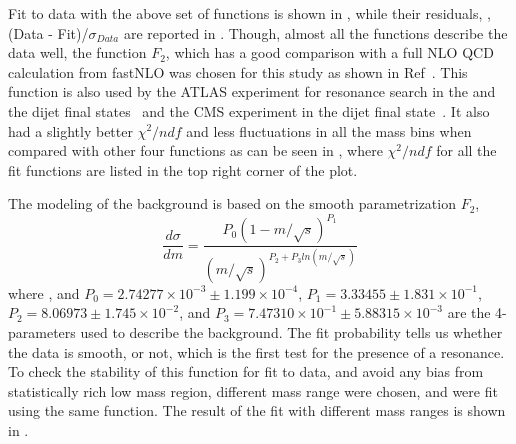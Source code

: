 Fit to data with the above set of functions is shown in \fig{\ref{fig:FitDiffFunction}}, while their residuals, \ie, (Data - Fit)/$\sigma_{Data}$
are reported in \fig{\ref{fig:FitDifFunctionResiduals}}. Though, almost all the functions describe the data well, the function $F_{2}$, which
has a good comparison with a full NLO QCD calculation from fastNLO was chosen for this study as shown in Ref~\cite{Aaltonen:2008dn}. This function
is also used by the ATLAS experiment for resonance search in the \gamjet and the dijet final states~\cite{ATLAS:2011ai,Aad:2013cva} and the CMS 
experiment in the dijet final state~\cite{Chatrchyan:2013qha}. It also had a slightly better $\chi^{2}/ndf$ and less fluctuations in all the mass bins 
when compared with other four functions as can be seen in \fig{\ref{fig:FitDiffFunction}}, where $\chi^{2}/ndf$ for all the fit functions are listed
in the top right corner of the plot. 

The modeling of the \gamjet background is based on the smooth parametrization $F_{2}$,
\begin{equation}
\frac{d\sigma}{dm} = \frac{P_{0}(1-m/\sqrt{s})^{P_{1}}}{(m/\sqrt{s})^{P_{2}+P_{3}ln(m/\sqrt{s})}}
\label{Eq:fitFunc}
\end{equation}
where \sqrteighttev, and $P_0=2.74277\times10^{-3}\pm1.199\times10^{-4}$, $P_1=3.33455\pm1.831\times10^{-1}$, $P_2=8.06973\pm1.745\times10^{-2}$,
 and $P_3=7.47310\times10^{-1}\pm5.88315\times10^{-3}$ are the 4-parameters used to describe the background. The fit probability tells us whether the data is smooth, or not, which is the first test for the presence of a resonance. To check the stability of this function for fit to data, and avoid any 
bias from statistically rich low mass region, different mass range were chosen, and were fit using the same function. The result of the fit with 
different mass 
ranges is shown in \fig{\ref{fig:DiffRangeFit}}.


